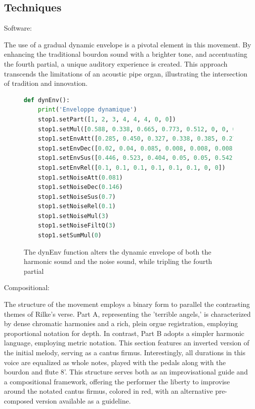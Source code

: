 \documentclass[12pt,twoside,maitrise]{dms_ks}
\theoremstyle{definition}
\begin{document}
\subsection{Techniques}

Software:

The use of a gradual dynamic envelope is a pivotal element in this movement.
By enhancing the traditional bourdon sound with a brighter tone, and accentuating the fourth partial, a unique auditory experience is created.
This approach transcends the limitations of an acoustic pipe organ, illustrating the intersection of tradition and innovation.

\begin{figure}[H]
\begin{lstlisting}[language=Python]
def dynEnv():
    print('Enveloppe dynamique')
    stop1.setPart([1, 2, 3, 4, 4, 4, 0, 0])
    stop1.setMul([0.588, 0.338, 0.665, 0.773, 0.512, 0, 0, 0])
    stop1.setEnvAtt([0.285, 0.450, 0.327, 0.338, 0.385, 0.277, 0, 0])
    stop1.setEnvDec([0.02, 0.04, 0.085, 0.008, 0.008, 0.008, 0, 0])
    stop1.setEnvSus([0.446, 0.523, 0.404, 0.05, 0.05, 0.542, 0, 0])
    stop1.setEnvRel([0.1, 0.1, 0.1, 0.1, 0.1, 0.1, 0, 0])
    stop1.setNoiseAtt(0.081)
    stop1.setNoiseDec(0.146)
    stop1.setNoiseSus(0.7)
    stop1.setNoiseRel(0.1)
    stop1.setNoiseMul(3)
    stop1.setNoiseFiltQ(3)
    stop1.setSumMul(0)
\end{lstlisting}
\caption{The dynEnv function alters the dynamic envelope of both the harmonic sound and the noise sound, while tripling the fourth partial}
\end{figure}

Compositional:

The structure of the movement employs a binary form to parallel the contrasting themes of Rilke's verse.
Part A, representing the 'terrible angels,' is characterized by dense chromatic harmonies and a rich, plein orgue registration, employing proportional notation for depth.
In contrast, Part B adopts a simpler harmonic language, employing metric notation.
This section features an inverted version of the initial melody, serving as a cantus firmus.
Interestingly, all durations in this voice are equalized as whole notes, played with the pedals along with the bourdon and flute 8’.
This structure serves both as an improvisational guide and a compositional framework, offering the performer the liberty to improvise around the notated cantus firmus, colored in red, with an alternative pre-composed version available as a guideline.
\end{document}
